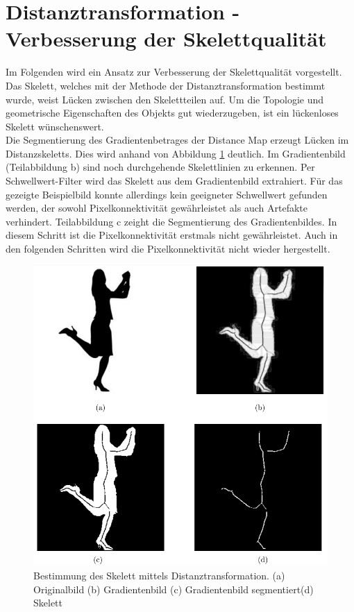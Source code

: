 \section{Distanztransformation - Verbesserung der Skelettqualität}
\label{sec:verbesserung}
Im Folgenden wird ein Ansatz zur Verbesserung der Skelettqualität
vorgestellt. \\
Das Skelett, welches mit der Methode der Distanztransformation bestimmt wurde, weist Lücken zwischen den Skelettteilen auf. Um die Topologie und geometrische Eigenschaften des Objekts gut wiederzugeben, ist ein lückenloses Skelett wünschenswert. \\
Die Segmentierung des Gradientenbetrages der Distance Map erzeugt Lücken im Distanzskeletts. Dies wird anhand von Abbildung \ref{fig:person-skelett} deutlich. Im Gradientenbild (Teilabbildung b) sind noch durchgehende Skelettlinien zu erkennen. Per Schwellwert-Filter wird das Skelett aus dem Gradientenbild extrahiert. Für das gezeigte Beispielbild konnte allerdings kein geeigneter Schwellwert gefunden werden, der sowohl Pixelkonnektivität gewährleistet als auch Artefakte verhindert. Teilabbildung c zeight die Segmentierung des Gradientenbildes. In diesem Schritt ist die Pixelkonnektivität erstmals nicht gewährleistet. Auch in den folgenden Schritten wird die Pixelkonnektivität nicht wieder hergestellt. 
\begin{figure}[htbp]
\centering
\includegraphics[width=1.0\linewidth]{./fig/person_gradienten_problem.pdf}
\caption{Bestimmung des Skelett mittels Distanztransformation. (a) Originalbild (b) Gradientenbild (c) Gradientenbild segmentiert(d) Skelett}
\label{fig:person-skelett}
\end{figure}\\
